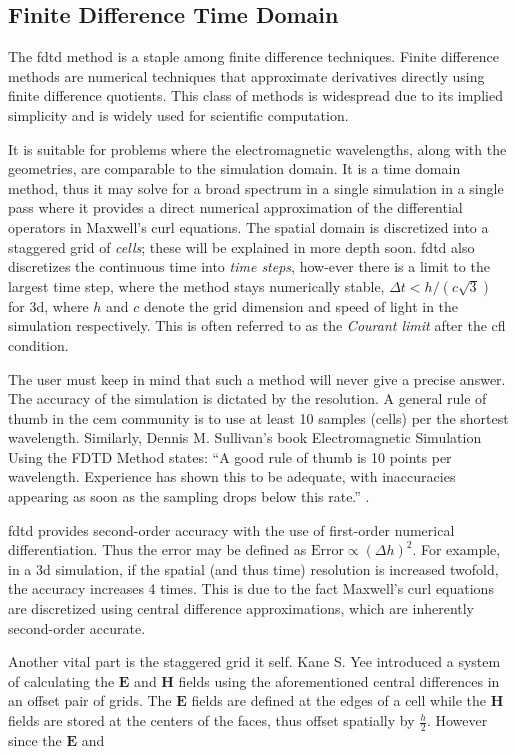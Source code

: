 \subsection*{Finite Difference Time Domain}
The \gls{fdtd} method is a staple among finite difference techniques. Finite difference methods are numerical techniques that approximate derivatives directly using finite difference quotients. This class of methods is widespread due to its implied simplicity and is widely used for scientific computation. 


It is suitable for problems where the electromagnetic wavelengths, along with the geometries, are comparable to the simulation domain. It is a time domain method, thus it may solve for a broad spectrum in a single simulation in a single pass where it provides a direct numerical approximation of the differential operators in Maxwell's curl equations. The spatial domain is discretized into a staggered grid of \textit{cells}; these will be explained in more depth soon. \gls{fdtd} also discretizes the continuous time into \textit{time steps}, how-ever there is a limit to the largest time step, where the method stays numerically stable, $\Delta t < h / \left( c \sqrt{3} \right)$ for \gls{3d}, where $h$ and $c$ denote the grid dimension and speed of light in the simulation respectively. This is often referred to as the \textit{Courant limit} after the \gls{cfl} condition.


The user must keep in mind that such a method will never give a precise answer. The accuracy of the simulation is dictated by the resolution. A general rule of thumb in the \gls{cem} community is to use at least 10 samples (cells) per the shortest wavelength. Similarly, Dennis M. Sullivan's book Electromagnetic Simulation Using the FDTD Method states: “A good rule of thumb is 10 points per wavelength. Experience has shown this to be adequate, with inaccuracies appearing as soon as the sampling drops below this rate.” \cite[p.10]{sullivan2013fdtd}.


\gls{fdtd} provides second-order accuracy with the use of first-order numerical differentiation. Thus the error may be defined as $\text{Error} \propto (\Delta h)^2$. For example, in a \gls{3d} simulation, if the spatial (and thus time) resolution is increased twofold, the accuracy increases 4 times. This is due to the fact Maxwell’s curl equations are discretized using central difference approximations, which are inherently second-order accurate.


Another vital part is the staggered grid it self. Kane S. Yee introduced a system of calculating the $\mathbf{E}$ and $\mathbf{H}$ fields using the aforementioned central differences in an offset pair of grids. The $\mathbf{E}$ fields are defined at the edges of a cell while the $\mathbf{H}$ fields are stored at the centers of the faces, thus offset spatially by $\frac{h}{2}$.  However since the $\mathbf{E}$ and 


